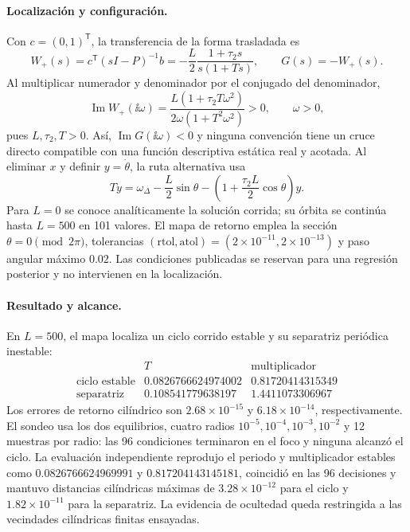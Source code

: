\paragraph{Localización y configuración.}
Con \(c=(0,1)^{\mathsf T}\), la transferencia de la forma trasladada es
\begin{equation}
 W_+(s)=c^{\mathsf T}(sI-P)^{-1}b
 =-\frac{L}{2}\frac{1+\tau_2s}{s(1+Ts)},\qquad G(s)=-W_+(s).
 \label{ncbench:eq:pll-transfer}
\end{equation}
Al multiplicar numerador y denominador por el conjugado del denominador,
\[
 \operatorname{Im}W_+(\ii\omega)
 =\frac{L(1+\tau_2T\omega^2)}{2\omega(1+T^2\omega^2)}>0,
 \qquad \omega>0,
\]
pues \(L,\tau_2,T>0\). Así, \(\operatorname{Im}G(\ii\omega)<0\) y ninguna
convención tiene un cruce directo compatible con una función
descriptiva estática real y acotada. Al eliminar \(x\) y definir
\(y=\dot\theta\), la ruta alternativa usa
\begin{equation}
 T\dot y=\omega_\Delta-\frac{L}{2}\sin\theta
 -\left(1+\frac{\tau_2L}{2}\cos\theta\right)y.
 \label{ncbench:eq:pll-andronov}
\end{equation}
Para \(L=0\) se conoce analíticamente la solución corrida; su órbita se
continúa hasta \(L=500\) en 101 valores. El mapa de retorno emplea la sección
\(\theta=0\pmod{2\pi}\), tolerancias
\((\mathrm{rtol},\mathrm{atol})=(2\times10^{-11},2\times10^{-13})\) y paso
angular máximo \(0.02\). Las condiciones publicadas se reservan para una
regresión posterior y no intervienen en la localización.

\paragraph{Resultado y alcance.}
En \(L=500\), el mapa localiza un ciclo corrido estable y su separatriz
periódica inestable:
\begin{equation}
 \begin{array}{c|cc}
 &T&\text{multiplicador}\\ \hline
 \text{ciclo estable}&0.0826766624974002&0.81720414315349\\
 \text{separatriz}&0.108541779638197&1.4411073306967
 \end{array}
 \label{ncbench:eq:pll-cycle-results}
\end{equation}
Los errores de retorno cilíndrico son \(2.68\times10^{-15}\) y
\(6.18\times10^{-14}\), respectivamente. El sondeo usa los dos equilibrios,
cuatro radios \(10^{-5},10^{-4},10^{-3},10^{-2}\) y 12 muestras por radio:
las 96 condiciones terminaron en el foco y ninguna alcanzó el ciclo. La
evaluación independiente reprodujo el periodo y multiplicador estables
como \(0.0826766624969991\) y \(0.817204143145181\), coincidió en las 96
decisiones y mantuvo distancias cilíndricas máximas de
\(3.28\times10^{-12}\) para el ciclo y \(1.82\times10^{-11}\) para la
separatriz. La evidencia de ocultedad queda restringida a las vecindades
cilíndricas finitas ensayadas.


